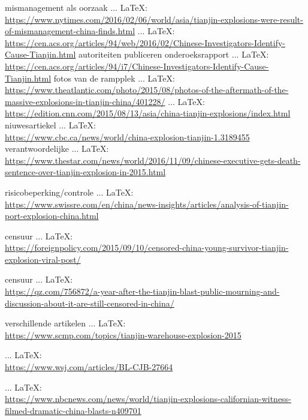 \begin{thebibliography}{99}
{{{{	    	mismanagement als oorzaak
	    	 ... \LaTeX:\\ \url{https://www.nytimes.com/2016/02/06/world/asia/tianjin-explosions-were-result-of-mismanagement-china-finds.html}
	   ... \LaTeX:\\ \url{https://cen.acs.org/articles/94/web/2016/02/Chinese-Investigators-Identify-Cause-Tianjin.html}
	    	autoriteiten publiceren onderoeksrapport
	    	 ... \LaTeX:\\ \url{https://cen.acs.org/articles/94/i7/Chinese-Investigators-Identify-Cause-Tianjin.html}
	    	fotos van de rampplek
	   ... \LaTeX:\\ \url{https://www.theatlantic.com/photo/2015/08/photos-of-the-aftermath-of-the-massive-explosions-in-tianjin-china/401228/}
	    	 ... \LaTeX:\\ \url{https://edition.cnn.com/2015/08/13/asia/china-tianjin-explosions/index.html}
	    	niuwesartiekel
     ... \LaTeX:\\ \url{https://www.cbc.ca/news/world/china-explosion-tianjin-1.3189455}
    verantwoordelijke
     ... \LaTeX:\\ \url{https://www.thestar.com/news/world/2016/11/09/chinese-executive-gets-death-sentence-over-tianjin-explosion-in-2015.html}

    risicobeperking/controle
     ... \LaTeX:\\ \url{https://www.swissre.com/en/china/news-insights/articles/analysis-of-tianjin-port-explosion-china.html}

    censuur
     ... \LaTeX:\\ \url{https://foreignpolicy.com/2015/09/10/censored-china-young-survivor-tianjin-explosion-viral-post/}

    censuur
     ... \LaTeX:\\ \url{https://qz.com/756872/a-year-after-the-tianjin-blast-public-mourning-and-discussion-about-it-are-still-censored-in-china/}

    verschillende artikelen
     ... \LaTeX:\\ \url{https://www.scmp.com/topics/tianjin-warehouse-explosion-2015}

     ... \LaTeX:\\ \url{https://www.wsj.com/articles/BL-CJB-27664}

     ... \LaTeX:\\ \url{https://www.nbcnews.com/news/world/tianjin-explosions-californian-witness-filmed-dramatic-china-blasts-n409701}

}}}}
\end{thebibliography}
